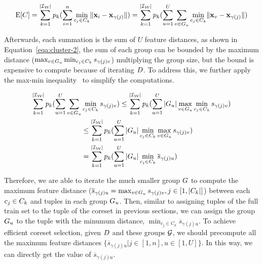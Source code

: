 \begin{equation}\label{eqa:cluster-1}
    \mathrm{E}[C] = \sum_{k= 1}^{|\mathcal{I_W}|} p_k (\sum_{i=1}^n \min_{c_j\in C_k}\lVert\mathbf{x}_i - \mathbf{x}_{\gamma(j)}\rVert) =  \sum_{k= 1}^{|\mathcal{I_W}|} p_k (\sum_{u=1}^U\sum_{v \in G_u} \min_{c_j\in C_k}\lVert\mathbf{x}_v - \mathbf{x}_{\gamma(j)}\rVert)
\end{equation}

Afterwards, each summation is the sum of $U$ feature distances, as shown in Equation~\ref{eqa:cluster-2},  the sum of each group can be bounded by  the maximum distance ($\max_{v \in G_u} \min_{c_j\in C_k} s_{\gamma(j)v}$)  multiplying the  group size, but the bound is expensive to compute because of iterating $D$. To address this, we further apply the max-min inequality~\cite{boyd2004convex} to simplify the computations. 


\begin{equation}\label{eqa:cluster-2}
    \begin{aligned}
        \sum_{k= 1}^{|\mathcal{I_W}|} p_k (\sum_{u=1}^U\sum_{v \in G_u} & \min_{c_j\in C_k} s_{\gamma(j)v}) \leq \sum_{k= 1}^{|\mathcal{I_W}|} p_k (\sum_{u=1}^U |G_u| \max_{v \in G_u} \min_{c_j\in C_k}s_{\gamma(j)v}) \\
        & \leq \sum_{k= 1}^{|\mathcal{I_W}|} p_k (\sum_{u=1}^U |G_u| \min_{c_j\in C_k} \max_{v \in G_u}s_{\gamma(j)v}) \\
        & =  \sum_{k= 1}^{|\mathcal{I_W}|} p_k (\sum_{u=1}^U |G_u| \min_{c_j\in C_k} \overline{s}_{\gamma(j)u})
    \end{aligned}
\end{equation}



Therefore,  we are able to iterate the much smaller group $G$ to compute  the maximum feature distance (\ie $\overline{s}_{\gamma(j)u} = \max_{v \in G_u}s_{\gamma(j)v}, j \in [1,|C_k|]$) between each $c_j \in C_k$ and tuples in each group $G_u$. Then, similar to assigning tuples of the full train set to the tuple of the coreset in previous sections, we can assign the group $G_u$ to the tuple  with the minumum distance, \ie $\min_{c_j\in C_k} \overline{s}_{\gamma(j)u}$. To achieve efficient coreset selection, given $D$ and these groups $\mathcal{G}$, we should precompute all the maximum feature distances $\{\overline{s}_{\gamma(j)u}|j \in [1,n], u \in [1,U]\}$. In this way, we can directly get the value of $\overline{s}_{\gamma(j)u}$.

